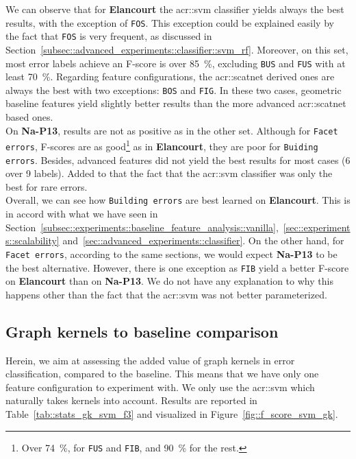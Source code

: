             We can observe that for \textbf{Elancourt} the \gls{acr::svm} classifier yields always the best results, with the exception of \texttt{FOS}.
            This exception could be explained easily by the fact that \texttt{FOS} is very frequent, as discussed in Section~\ref{subsec::advanced_experiments::classifier::svm_rf}.
            Moreover, on this set, most error labels achieve an F-score is over \SI{85}{\percent}, excluding \texttt{BUS} and \texttt{FUS} with at least \SI{70}{\percent}.
            Regarding feature configurations, the \gls{acr::scatnet} derived ones are always the best with two exceptions: \texttt{BOS} and \texttt{FIG}.
            In these two cases, geometric baseline features yield slightly better results than the more advanced \gls{acr::scatnet} based ones.\\

            On \textbf{Na-P13}, results are not as positive as in the other set.
            Although for \texttt{Facet errors}, F-scores are as good\footnote{
                Over \SI{74}{\percent}, for \texttt{FUS} and \texttt{FIB}, and \SI{90}{\percent} for the rest.
            } as in \textbf{Elancourt}, they are poor for \texttt{Buiding errors}.
            Besides, advanced features did not yield the best results for most cases (6 over 9 labels).
            Added to that the fact that the \gls{acr::svm} classifier was only the best for rare errors.\\

            Overall, we can see how \texttt{Building errors} are best learned on \textbf{Elancourt}.
            This is in accord with what we have seen in Section~\ref{subsec::experiments::baseline_feature_analysis::vanilla},~\ref{sec::experiments::scalability} and~\ref{sec::advanced_experiments::classifier}.
            On the other hand, for \texttt{Facet errors}, according to the same sections, we would expect \textbf{Na-P13} to be the best alternative.
            However, there is one exception as \texttt{FIB} yield a better F-score on \textbf{Elancourt} than on \textbf{Na-P13}.
            We do not have any explanation to why this happens other than the fact that the \gls{acr::svm} was not better parameterized.

    \subsection{Graph kernels to baseline comparison}
        \label{subsec::advanced_experiments::better_features::graph_kernel_baseline}
        Herein, we aim at assessing the added value of graph kernels in error classification, compared to the baseline.
        This means that we have only one feature configuration to experiment with.
        We only use the \gls{acr::svm} which naturally takes kernels into account.
        Results are reported in Table~\ref{tab::stats_gk_svm_f3} and visualized in Figure~\ref{fig::f_score_svm_gk}.\\

